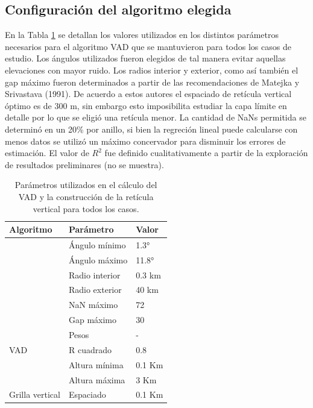 \documentclass[12pt,spanish,oneside, a4paper]{book}
\begin{document}
\subsection{Configuración del algoritmo
elegida}\label{configuracion-del-algoritmo-elegida}

En la Tabla \ref{parametros} se detallan los valores utilizados en los
distintos parámetros necesarios para el algoritmo VAD que se mantuvieron
para todos los casos de estudio. Los ángulos utilizados fueron elegidos
de tal manera evitar aquellas elevaciones con mayor ruido. Los radios
interior y exterior, como así también el gap máximo fueron determinados
a partir de las recomendaciones de Matejka y Srivastava (1991). De
acuerdo a estos autores el espaciado de retícula vertical óptimo es de
300 m, sin embargo esto imposibilita estudiar la capa límite en detalle
por lo que se eligió una retícula menor. La cantidad de NaNs permitida
se determinó en un 20\% por anillo, si bien la regreción lineal puede
calcularse con menos datos se utilizó un máximo concervador para
disminuir los errores de estimación. El valor de \(R^2\) fue definido
cualitativamente a partir de la exploración de resultados preliminares
(no se muestra).

\begin{table}

\caption{\label{tab:parametros}Parámetros utilizados en el cálculo del VAD y la construcción de la retícula vertical para todos los casos. \label{parametros}}
\centering
\begin{tabular}[t]{lll}
\toprule
Algoritmo & Parámetro & Valor\\
\midrule
 & Ángulo mínimo & 1.3°\\
\cmidrule{2-3}
 & Ángulo máximo & 11.8°\\
\cmidrule{2-3}
 & Radio interior & 0.3 km\\
\cmidrule{2-3}
 & Radio exterior & 40 km\\
\cmidrule{2-3}
 & NaN máximo & 72\\
\cmidrule{2-3}
 & Gap máximo & 30\\
\cmidrule{2-3}
 & Pesos & -\\
\cmidrule{2-3}
\multirow{-8}{*}{\raggedright\arraybackslash VAD} & R cuadrado & 0.8\\
\cmidrule{1-3}
 & Altura mínima & 0.1 Km\\
\cmidrule{2-3}
 & Altura máxima & 3 Km\\
\cmidrule{2-3}
\multirow{-3}{*}{\raggedright\arraybackslash Grilla vertical} & Espaciado & 0.1 Km\\
\bottomrule
\end{tabular}
\end{table}
\end{document}
